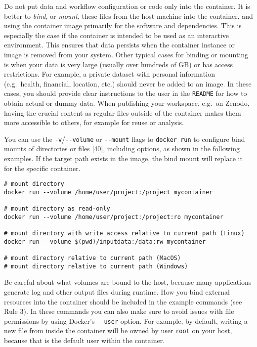 \documentclass[10pt,letterpaper]{article}
\begin{document}
Do not put data and workflow configuration or code only into the
container. It is better to \emph{bind}, or \emph{mount}, these files
from the host machine into the container, and using the container image
primarily for the software and dependencies. This is especially the case
if the container is intended to be used as an interactive environment.
This ensures that data persists when the container instance or image is
removed from your system. Other typical cases for binding or mounting is
when your data is very large (usually over hundreds of GB) or has access
restrictions. For example, a private dataset with personal information
(e.g.~health, financial, location, etc.) should never be added to an
image. In these cases, you should provide clear instructions to the user
in the \texttt{README} for how to obtain actual or dummy data. When
publishing your workspace, e.g.~on Zenodo, having the crucial content as
regular files outside of the container makes them more accessible to
others, for example for reuse or analysis.

You can use the \texttt{-v}/\texttt{-\/-volume} or \texttt{-\/-mount}
flags to \texttt{docker\ run} to configure bind mounts of directories or
files {[}40{]}, including options, as shown in the following examples.
If the target path exists in the image, the bind mount will replace it
for the specific container.

\begin{verbatim}
# mount directory
docker run --volume /home/user/project:/project mycontainer

# mount directory as read-only
docker run --volume /home/user/project:/project:ro mycontainer

# mount directory with write access relative to current path (Linux)
docker run --volume $(pwd)/inputdata:/data:rw mycontainer

# mount directory relative to current path (MacOS)
# mount directory relative to current path (Windows)
\end{verbatim}

Be careful about what volumes are bound to the host, because many
applications generate log and other output files during runtime. How you
bind external resources into the container should be included in the
example commands (see Rule 3). In these commands you can also make sure
to avoid issues with file permissions by using Docker's
\texttt{-\/-user} option. For example, by default, writing a new file
from inside the container will be owned by user \texttt{root} on your
host, because that is the default user within the container.
\end{document}
